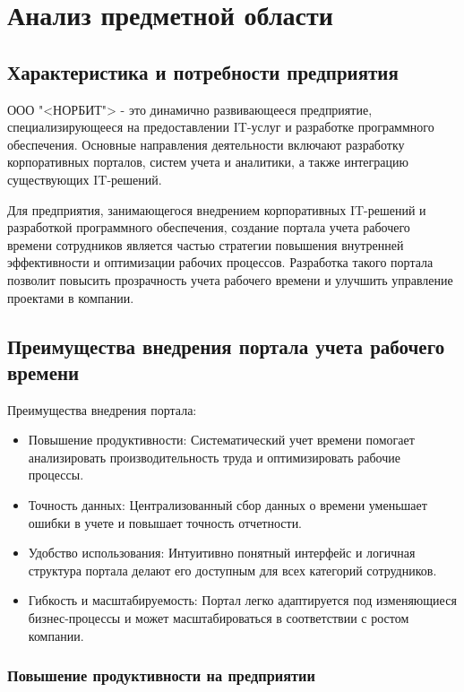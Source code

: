 \section{Анализ предметной области}
\subsection{Характеристика и потребности предприятия}

ООО "<НОРБИТ"> - это динамично развивающееся предприятие, специализирующееся на предоставлении IT-услуг и разработке программного обеспечения. Основные направления деятельности включают разработку корпоративных порталов, систем учета и аналитики, а также интеграцию существующих IT-решений.

Для предприятия, занимающегося внедрением корпоративных IT-решений и разработкой программного обеспечения, создание портала учета рабочего времени сотрудников является частью стратегии повышения внутренней эффективности и оптимизации рабочих процессов. Разработка такого портала позволит повысить прозрачность учета рабочего времени и улучшить управление проектами в компании.


\subsection{Преимущества внедрения портала учета рабочего времени}

Преимущества внедрения портала:

\begin{itemize}
\item Повышение продуктивности: Систематический учет времени помогает анализировать производительность труда и оптимизировать рабочие процессы.

\item Точность данных: Централизованный сбор данных о времени уменьшает ошибки в учете и повышает точность отчетности.

\item Удобство использования: Интуитивно понятный интерфейс и логичная структура портала делают его доступным для всех категорий сотрудников.

\item Гибкость и масштабируемость: Портал легко адаптируется под изменяющиеся бизнес-процессы и может масштабироваться в соответствии с ростом компании.
\end{itemize}

\subsubsection{Повышение продуктивности на предприятии}

